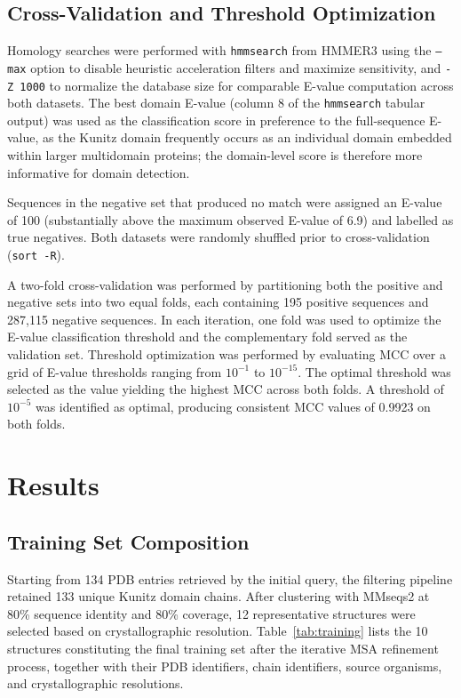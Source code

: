 \documentclass[11pt, a4paper]{article}
\begin{document}
\subsection{Cross-Validation and Threshold Optimization}

Homology searches were performed with \texttt{hmmsearch} from 
HMMER3 \cite{Eddy2011} using the \texttt{--max} option to 
disable heuristic acceleration filters and maximize sensitivity, 
and \texttt{-Z 1000} to normalize the database size for 
comparable E-value computation across both datasets. The best 
domain E-value (column 8 of the \texttt{hmmsearch} tabular 
output) was used as the classification score in preference to 
the full-sequence E-value, as the Kunitz domain frequently 
occurs as an individual domain embedded within larger 
multidomain proteins; the domain-level score is therefore 
more informative for domain detection.

Sequences in the negative set that produced no match were 
assigned an E-value of 100 (substantially above the maximum 
observed E-value of 6.9) and labelled as true negatives. Both 
datasets were randomly shuffled prior to cross-validation 
(\texttt{sort -R}).

A two-fold cross-validation was performed by partitioning 
both the positive and negative sets into two equal folds, 
each containing 195 positive sequences and 287{,}115 negative 
sequences. In each iteration, one fold was used to optimize 
the E-value classification threshold and the complementary 
fold served as the validation set. Threshold optimization was 
performed by evaluating MCC over a grid of E-value thresholds 
ranging from $10^{-1}$ to $10^{-15}$. The optimal threshold 
was selected as the value yielding the highest MCC across 
both folds. A threshold of $10^{-5}$ was identified as optimal, 
producing consistent MCC values of 0.9923 on both folds.

\section{Results}

\subsection{Training Set Composition}

Starting from 134 PDB entries retrieved by the initial query, 
the filtering pipeline retained 133 unique Kunitz domain chains. 
After clustering with MMseqs2 at 80\% sequence identity and 80\% 
coverage, 12 representative structures were selected based on 
crystallographic resolution. Table~\ref{tab:training} lists the 
10 structures constituting the final training set after the 
iterative MSA refinement process, together with their PDB 
identifiers, chain identifiers, source organisms, and 
crystallographic resolutions.
\end{document}
